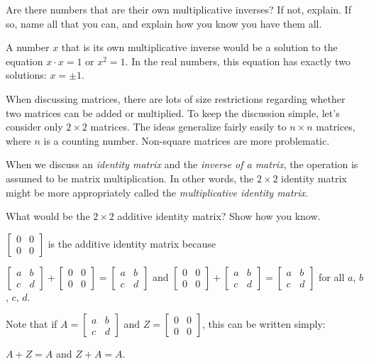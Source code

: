 \documentclass[space,handout,nooutcomes]{ximera}
\begin{document}
\begin{question}
Are there numbers that are their own multiplicative inverses?  If not, explain.  If so, name all that you can, and explain how you know you have them all.
\begin{freeResponse}
A number $x$ that is its own multiplicative inverse would be a solution to the equation $x\cdot x=1$ or $x^2=1$.  In the real numbers, this equation has exactly two solutions:  $x = \pm 1$.  
\end{freeResponse}
\end{question}

When discussing matrices, there are lots of size restrictions
regarding whether two matrices can be added or multiplied.  To keep
the discussion simple, let's consider only $2\times 2$ matrices.  The
ideas generalize fairly easily to $n\times n$ matrices, where $n$ is a
counting number.  Non-square matrices are more problematic.

When we discuss an \emph{identity matrix} and the \emph{inverse of a
  matrix}, the operation is assumed to be matrix multiplication.  In
other words, the $2\times 2$ identity matrix might be more
appropriately called the \emph{multiplicative identity matrix}.

\begin{question}
What would be the $2\times 2$ additive identity matrix?  Show how you
know.
\begin{freeResponse}
$\begin{bmatrix} 0&0 \\ 0&0 \end{bmatrix}$ is the additive identity matrix because 

$\begin{bmatrix} a&b \\ c&d \end{bmatrix} + \begin{bmatrix} 0&0 \\ 0&0 \end{bmatrix} = 
\begin{bmatrix} a&b \\ c&d \end{bmatrix}$  
and
$\begin{bmatrix} 0&0 \\ 0&0 \end{bmatrix} + \begin{bmatrix} a&b \\ c&d \end{bmatrix} = 
\begin{bmatrix} a&b \\ c&d \end{bmatrix}$  for all $a$, $b$, $c$, $d$.  

Note that if $A = \begin{bmatrix} a&b \\ c&d \end{bmatrix}$ and $Z = \begin{bmatrix} 0&0 \\ 0&0 \end{bmatrix}$, this can be written simply:  

$A + Z = A$ and $Z+A = A$.  
\end{freeResponse}
\end{question}
\end{document}
